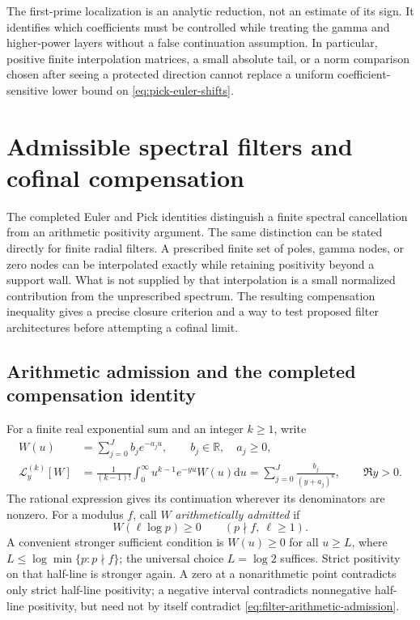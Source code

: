 \documentclass[11pt]{article}
\theoremstyle{definition}
\theoremstyle{remark}
\newcommand{\R}{\mathbb R}
\newcommand{\dd}{\mathrm d}
\begin{document}
The first-prime localization is an analytic reduction, not an estimate
of its sign.  It identifies which coefficients must be controlled
while treating the gamma and higher-power layers without a false
continuation assumption.  In particular, positive finite
interpolation matrices, a small absolute tail, or a norm comparison
chosen after seeing a protected direction cannot replace a uniform
coefficient-sensitive lower bound on
\eqref{eq:pick-euler-shifts}.


\section{Admissible spectral filters and cofinal compensation}
\label{sec:admissible-spectral-filters}

The completed Euler and Pick identities distinguish a finite spectral
cancellation from an arithmetic positivity argument.  The same distinction
can be stated directly for finite radial filters.  A prescribed finite set
of poles, gamma nodes, or zero nodes can be interpolated exactly while
retaining positivity beyond a support wall.  What is not supplied by that
interpolation is a small normalized contribution from the unprescribed
spectrum.  The resulting compensation inequality gives a precise closure
criterion and a way to test proposed filter architectures before attempting
a cofinal limit.

\subsection{Arithmetic admission and the completed compensation identity}
\label{subsec:filter-compensation}

For a finite real exponential sum and an integer $k\ge1$, write
\begin{equation}
 \begin{split}
 W(u)&=\sum_{j=0}^J b_je^{-a_ju},\qquad b_j\in\R,\quad a_j\ge0,\\
 \mathcal L_y^{(k)}[W]
 &=\frac1{(k-1)!}\int_0^\infty u^{k-1}e^{-yu}W(u)\dd u
   =\sum_{j=0}^J\frac{b_j}{(y+a_j)^k},\qquad \Re y>0.
 \end{split}
 \label{eq:filter-response}
\end{equation}
The rational expression gives its continuation wherever its denominators
are nonzero.  For a modulus $f$, call $W$ \emph{arithmetically admitted} if
\begin{equation}
 W(\ell\log p)\ge0\qquad(p\nmid f,\ \ell\ge1).
 \label{eq:filter-arithmetic-admission}
\end{equation}
A convenient stronger sufficient condition is $W(u)\ge0$ for all $u\ge L$,
where $L\le\log\min\{p:p\nmid f\}$; the universal choice $L=\log2$
suffices.  Strict positivity on that half-line is stronger again.  A zero
at a nonarithmetic point contradicts only strict half-line positivity; a
negative interval contradicts nonnegative half-line positivity, but need
not by itself contradict \eqref{eq:filter-arithmetic-admission}.
\end{document}
